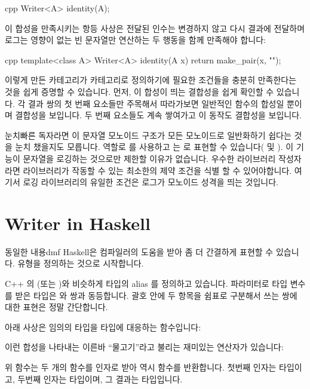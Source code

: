 \begin{snip}{cpp}
Writer<A> identity(A);
\end{snip}
이 합성을 만족시키는 항등 사상은 전달된 인수는 변경하지 않고 다시 결과에 전달하며 로그는
영향이 없는 빈 문자열만 연산하는 두 행동을 함께 만족해야 합니다:

\begin{snip}{cpp}
template<class A> Writer<A> identity(A x) {
    return make_pair(x, "");
}
\end{snip}
이렇게 만든 카테고리가 카테고리로 정의하기에 필요한 조건들을 충분히 만족한다는 것을 쉽게
증명할 수 있습니다. 먼저, 이 합성이 띄는 결합성을 쉽게 확인할 수 있습니다. 각 결과 쌍의
첫 번째 요소들만 주목해서 따라가보면 일반적인 함수의 합성일 뿐이며 결합성을 보입니다.
두 번째 요소들도 계속 쌓여가고 이 동작도 결합성을 보입니다.

눈치빠른 독자라면 이 문자열 모노이드 구조가 모든 모노이드로 일반화하기 쉽다는 것을
눈치 챘을지도 모릅니다.  역할로 를 사용하고
는 로 표현할 수 있습니다(\code{+} 및 ).
이 기능이 문자열을 로깅하는 것으로만 제한할 이유가 없습니다. 우수한 라이브러리 작성자라면
라이브러리가 작동할 수 있는 최소한의 제약 조건을 식별 할 수 있어야합니다. 여기서 로깅
라이브러리의 유일한 조건은 로그가 모노이드 성격을 띄는 것입니다.

\section{Writer in Haskell}

동일한 내용dmf Haskell은 컴파일러의 도움을 받아 좀 더 간결하게 표현할 수 있습니다.
 유형을 정의하는 것으로 시작합니다.

C++ 의  (또는 )와 비슷하게 타입의 alias 를
정의하고 있습니다. 파라미터로 타입 변수 를 받은  타입은
와  쌍과 동등합니다. 괄호 안에 두 항목을 쉼표로 구분해서 쓰는
쌍에 대한 표현은 정말 간단합니다.

아래 사상은 임의의 타입을  타입에 대응하는 함수입니다:

이런 합성을 나타내는 이른바 ``물고기''라고 불리는 재미있는 연산자가 있습니다:

위 함수는 두 개의 함수를 인자로 받아 역시 함수를 반환합니다. 첫번째 인자는
 타입이고, 두번째 인자는  타입이며,
그 결과는  타입입니다.

